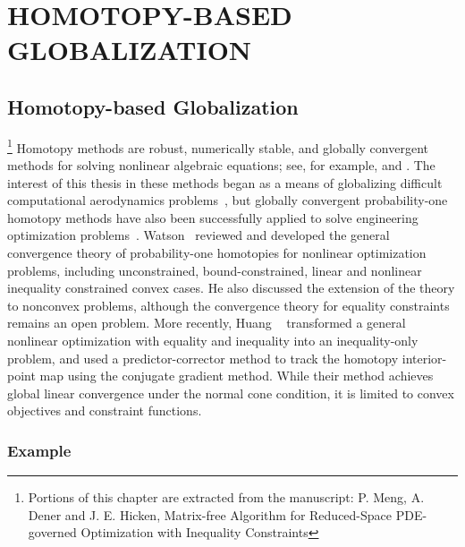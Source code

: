  
\chapter{HOMOTOPY-BASED GLOBALIZATION}\label{chap:homotopy}

\section{Homotopy-based Globalization}\label{sec:homotopy}
 \footnote{Portions of this chapter are extracted from the manuscript: P. Meng, A. Dener and J. E. Hicken, 
 Matrix-free Algorithm for Reduced-Space PDE-governed Optimization with Inequality Constraints}
Homotopy methods are robust, numerically stable, and globally convergent methods
for solving nonlinear algebraic equations; see, for example,
\cite{allgower_georg_1993} and \cite{Watson_1989}.  The interest of this thesis in these
methods began as a means of globalizing difficult computational aerodynamics
problems~\cite{hicken:cfd2009, hicken:cfd2011b, Brown_2016}, but globally
convergent probability-one homotopy methods have also been successfully applied
to solve engineering optimization problems~\cite{WATSON1989289}.  Watson~\cite{Watson_2001} reviewed
and developed the general convergence theory of probability-one homotopies for nonlinear optimization
problems, including unconstrained, bound-constrained, linear and nonlinear
inequality constrained convex cases.  He also discussed the extension of the
theory to nonconvex problems, although the convergence theory for equality
constraints remains an open problem.  More recently, Huang
\etal~\cite{huang_2012pc} transformed a general nonlinear optimization with
equality and inequality into an inequality-only problem, and used a
predictor-corrector method to track the homotopy interior-point map using the
conjugate gradient method. While their method achieves global linear convergence
under the normal cone condition, it is limited to convex objectives and
constraint functions.

\subsection{Example}

